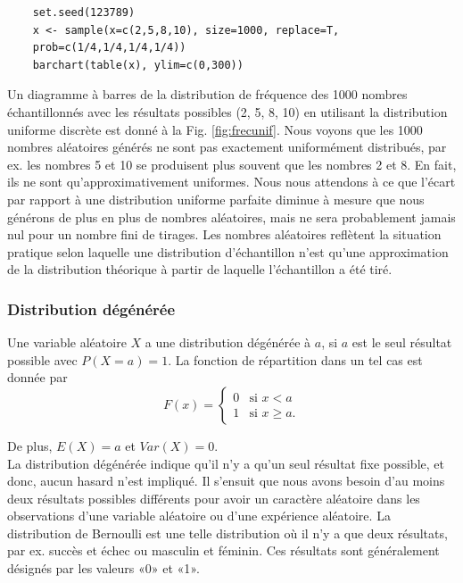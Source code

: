 {\begin{verbatim}
    set.seed(123789)
    x <- sample(x=c(2,5,8,10), size=1000, replace=T,
    prob=c(1/4,1/4,1/4,1/4))
    barchart(table(x), ylim=c(0,300))
\end{verbatim}

Un diagramme à barres de la distribution de fréquence des 1000 nombres échantillonnés avec les résultats possibles
(2, 5, 8, 10) en utilisant la distribution uniforme discrète est donné à la Fig. \ref{fig:frecunif}. Nous voyons que les 1000 nombres
aléatoires générés ne sont pas exactement uniformément distribués, par ex. les nombres 5 et 10 se produisent plus
souvent que les nombres 2 et 8. En fait, ils ne sont qu'approximativement uniformes. Nous nous attendons à ce que
l'écart par rapport à une distribution uniforme parfaite diminue à mesure que nous générons de plus en plus de nombres
aléatoires, mais ne sera probablement jamais nul pour un nombre fini de tirages. Les nombres aléatoires reflètent la
situation pratique selon laquelle une distribution d'échantillon n'est qu'une approximation de la distribution
théorique à partir de laquelle l'échantillon a été tiré.

\subsubsection{Distribution dégénérée}

\theoremstyle{definition}
\begin{definition}
    Une variable aléatoire $ X $ a une distribution dégénérée à $ a $, si $ a $ est le seul résultat possible
    avec $ P (X = a) = 1 $. La fonction de répartition dans un tel cas est donnée par
    $$F(x) = \begin{cases} 0 & \mbox{si   } x<a\\ 1 & \mbox{si } x\geq a.\end{cases}$$
\end{definition}
De plus, $E (X) = a$ et $Var (X) = 0$.\\
La distribution dégénérée indique qu'il n'y a qu'un seul résultat fixe possible, et donc, aucun hasard n'est impliqué.
Il s'ensuit que nous avons besoin d'au moins deux résultats possibles différents pour avoir un caractère aléatoire
dans les observations d'une variable aléatoire ou d'une expérience aléatoire. La distribution de Bernoulli est une
telle distribution où il n'y a que deux résultats, par ex. succès et échec ou masculin et féminin. Ces résultats sont
généralement désignés par les valeurs «0» et «1».

}
